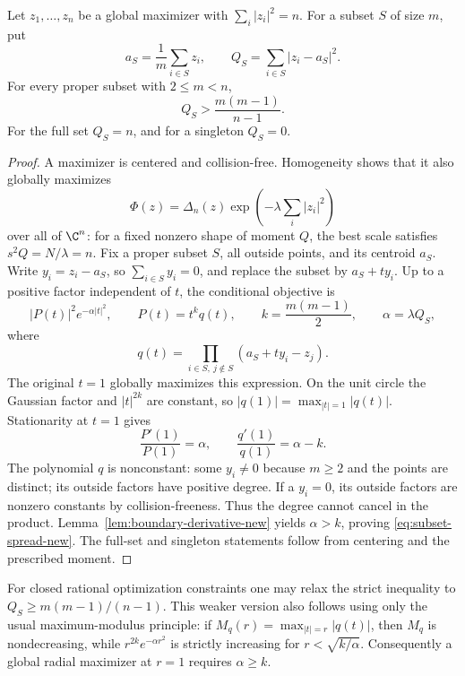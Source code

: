 \begin{theorem}\label{thm:subset-spread-new}
Let $z_1,\ldots,z_n$ be a global maximizer with
$\sum_i|z_i|^2=n$. For a subset $S$ of size $m$, put
\[
 a_S=\frac1m\sum_{i\in S}z_i,\qquad
 Q_S=\sum_{i\in S}|z_i-a_S|^2.
\]
For every proper subset with $2\le m<n$,
\begin{equation}\label{eq:subset-spread-new}
             Q_S>\frac{m(m-1)}{n-1}.
\end{equation}
For the full set $Q_S=n$, and for a singleton $Q_S=0$.
\end{theorem}
\begin{proof}
A maximizer is centered and collision-free. Homogeneity shows that it
also globally maximizes
\[
 \Phi(z)=\Delta_n(z)\exp\left(-\lambda\sum_i|z_i|^2\right)
\]
over all of $\C^n$: for a fixed nonzero shape of moment $Q$, the best
scale satisfies $s^2Q=N/\lambda=n$.
Fix a proper subset $S$, all outside points, and its centroid $a_S$.
Write $y_i=z_i-a_S$, so $\sum_{i\in S}y_i=0$, and replace the subset
by $a_S+t y_i$. Up to a positive factor independent of $t$, the
conditional objective is
\[
 |P(t)|^2e^{-\alpha|t|^2},\qquad
 P(t)=t^k q(t),\qquad k=\frac{m(m-1)}2,\qquad
 \alpha=\lambda Q_S,
\]
where
\[
 q(t)=\prod_{i\in S,\ j\notin S}(a_S+t y_i-z_j).
\]
The original $t=1$ globally maximizes this expression. On the unit
circle the Gaussian factor and $|t|^{2k}$ are constant, so
$|q(1)|=\max_{|t|=1}|q(t)|$. Stationarity at $t=1$ gives
\[
 \frac{P'(1)}{P(1)}=\alpha,
 \qquad \frac{q'(1)}{q(1)}=\alpha-k.
\]
The polynomial $q$ is nonconstant: some $y_i\ne0$ because $m\ge2$
and the points are distinct; its outside factors have positive degree.
If a $y_i=0$, its outside factors are nonzero constants by
collision-freeness. Thus the degree cannot cancel in the product.
Lemma~\ref{lem:boundary-derivative-new} yields $\alpha>k$, proving
\eqref{eq:subset-spread-new}. The full-set and singleton statements
follow from centering and the prescribed moment.
\end{proof}

\begin{remark}
For closed rational optimization constraints one may relax the strict
inequality to $Q_S\ge m(m-1)/(n-1)$. This weaker version also follows
using only the usual maximum-modulus principle: if
$M_q(r)=\max_{|t|=r}|q(t)|$, then $M_q$ is nondecreasing, while
$r^{2k}e^{-\alpha r^2}$ is strictly increasing for
$r<\sqrt{k/\alpha}$. Consequently a global radial maximizer at $r=1$
requires $\alpha\ge k$.
\end{remark}

